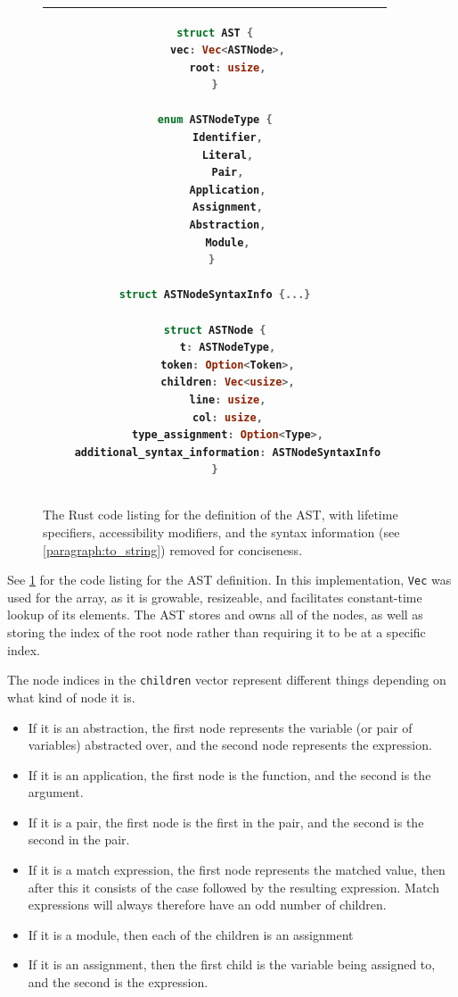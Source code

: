 \begin{figure}[t]
    \centering
    \begin{tabular}{|c|}
    \hline
    \begin{lstlisting}[language=Rust]
struct AST {
    vec: Vec<ASTNode>,
    root: usize,
}

enum ASTNodeType {
    Identifier,
    Literal,
    Pair,
    Application,
    Assignment,
    Abstraction,
    Module,
} 

struct ASTNodeSyntaxInfo {...}

struct ASTNode {
    t: ASTNodeType,
    token: Option<Token>,
    children: Vec<usize>,
    line: usize,
    col: usize,
    type_assignment: Option<Type>,
    additional_syntax_information: ASTNodeSyntaxInfo
}
    \end{lstlisting}
    \\\hline
    \end{tabular}
    \caption{The Rust code listing for the definition of the AST, with lifetime specifiers, accessibility modifiers, and the syntax information (see \ref{paragraph:to_string}) removed for conciseness.}
    \label{fig:ast_lst}
\end{figure}

See \ref{fig:ast_lst} for the code listing for the AST definition. In this implementation, \verb|Vec| was used for the array, as it is growable, resizeable, and facilitates constant-time lookup of its elements. The AST stores and owns all of the nodes, as well as storing the index of the root node rather than requiring it to be at a specific index. 

The node indices in the \verb|children| vector represent different things depending on what kind of node it is. 
\begin{itemize}
    \item If it is an abstraction, the first node represents the variable (or pair of variables) abstracted over, and the second node represents the expression.
    \item If it is an application, the first node is the function, and the second is the argument.
    \item If it is a pair, the first node is the first in the pair, and the second is the second in the pair.
    \item If it is a match expression, the first node represents the matched value, then after this it consists of the case followed by the resulting expression. Match expressions will always therefore have an odd number of children.
    \item If it is a module, then each of the children is an assignment
    \item If it is an assignment, then the first child is the variable being assigned to, and the second is the expression.
\end{itemize}

